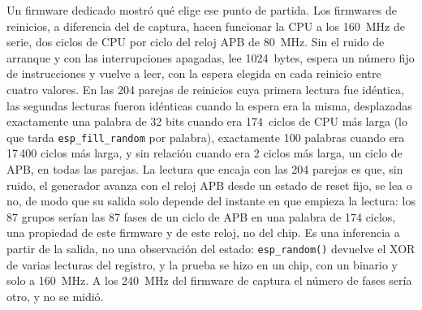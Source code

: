 Un firmware dedicado mostró qué elige ese punto de partida. Los firmwares
de reinicios, a diferencia del de captura, hacen funcionar la CPU a los
160~MHz de serie, dos ciclos de CPU por ciclo del reloj APB de 80~MHz. Sin el ruido
de arranque y con las interrupciones apagadas, lee 1024~bytes, espera un
número fijo de instrucciones y vuelve a leer, con la espera elegida en
cada reinicio entre cuatro valores. En las 204 parejas de reinicios cuya
primera lectura fue idéntica, las segundas lecturas fueron idénticas
cuando la espera era la misma, desplazadas exactamente una palabra de 32
bits cuando era 174~ciclos de CPU más larga (lo que tarda
\texttt{esp\_fill\_random} por palabra), exactamente 100 palabras cuando
era 17\,400 ciclos más larga, y sin relación cuando era 2 ciclos más
larga, un ciclo de APB, en todas las parejas. La lectura que encaja con
las 204 parejas es que, sin ruido, el generador
avanza con el reloj APB desde un estado de reset fijo, se lea o no, de
modo que su
salida solo depende del instante en que empieza la lectura: los 87 grupos
serían las 87 fases de un ciclo de APB en una palabra de 174 ciclos, una
propiedad de este firmware y de este reloj, no del chip. Es una
inferencia a partir de la salida, no una observación del estado:
\texttt{esp\_random()} devuelve el XOR de varias lecturas del registro,
y la prueba se hizo en un chip, con un binario y solo a 160~MHz. A los
240~MHz del firmware de captura el número de fases sería otro, y no se
midió.

